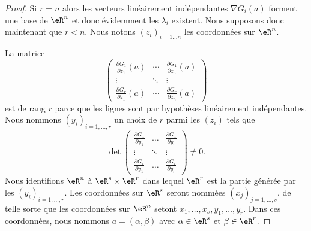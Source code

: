 \begin{proof}
    Si \( r=n\) alors les vecteurs linéairement indépendantes \( \nabla G_i(a) \) forment une base de \( \eR^n\) et donc évidemment les \( \lambda_i\) existent. Nous supposons donc maintenant que \( r<n\). Nous notons \( (z_i)_{i=1\ldots n}\) les coordonnées sur \( \eR^n\).

    La matrice
    \begin{equation}
        \begin{pmatrix}
            \frac{ \partial G_1 }{ \partial z_1 }(a)    &   \cdots    &   \frac{ \partial G_1 }{ \partial z_n }(a)    \\
            \vdots    &   \ddots    &   \vdots    \\
            \frac{ \partial G_r }{ \partial z_1 }(a)    &   \cdots    &   \frac{ \partial G_r }{ \partial z_n }(a)
        \end{pmatrix}
    \end{equation}
    est de rang \( r\) parce que les lignes sont par hypothèses linéairement indépendantes. Nous nommons \( (y_i)_{i=1,\ldots, r}\) un choix de \( r\) parmi les \( (z_i)\) tels que
    \begin{equation}
        \det\begin{pmatrix}
            \frac{ \partial G_1 }{ \partial y_1 }    &   \ldots    &   \frac{ \partial G_1 }{ \partial y_r }    \\
            \vdots    &   \ddots    &   \vdots    \\
            \frac{ \partial G_r }{ \partial y_1 }    &   \ldots    &   \frac{ \partial G_r }{ \partial y_r }
        \end{pmatrix}\neq 0.
    \end{equation}
    Nous identifions \( \eR^n\) à \( \eR^s\times \eR^r\) dans lequel \( \eR^r\) est la partie générée par les \( (y_i)_{i=1,\ldots, r}\). Les coordonnées sur \( \eR^s\) seront nommées \( (x_j)_{j=1,\ldots, s}\), de telle sorte que les coordonnées sur \( \eR^n\) setont \( x_1,\ldots, x_s,y_1,\ldots, y_r\). Dans ces coordonnées, nous nommons \( a=(\alpha,\beta)\) avec \( \alpha\in \eR^s\) et \( \beta\in \eR^r\).


\end{proof}
